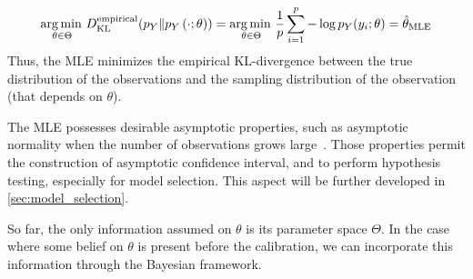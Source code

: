 \documentclass[../../Main_ManuscritThese.tex]{subfiles}
\begin{document}
\begin{equation}
  \operatorname*{arg\,min \,}_{\theta \in\Theta} D^{\mathrm{empirical}}_{\mathrm{KL}}(p_Y \| p_Y\left(\cdot;\theta \right)) = \operatorname*{arg\,min \,}_{\theta \in\Theta} \frac{1}{p} \sum_{i=1}^p - \log p_Y(y_i;\theta) = \hat{\theta}_{\mathrm{MLE}}
\end{equation}
Thus, the MLE minimizes the empirical KL-divergence between the true distribution of the observations and the sampling distribution of the observation (that depends on $\theta$).

The MLE possesses desirable asymptotic properties, such as asymptotic normality when the number of observations grows large~\cite{reid_aspects_2013}. Those properties permit the construction of asymptotic confidence interval, and to perform hypothesis testing, especially for model selection. This aspect will be further developed in \cref{sec:model_selection}.


 So far, the only information assumed on $\theta$ is its parameter space $\Theta$. In the case where some belief on $\theta$ is present before the calibration, we can incorporate this information through the Bayesian framework.
\end{document}
